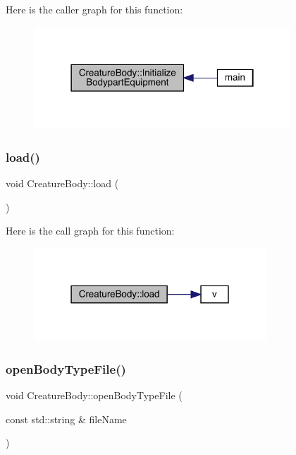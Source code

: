Here is the caller graph for this function\+:
\nopagebreak
\begin{figure}[H]
\begin{center}
\leavevmode
\includegraphics[width=273pt]{class_creature_body_af2b152c045862bb0fbc370b444bf98f0_icgraph}
\end{center}
\end{figure}
\mbox{\label{class_creature_body_a947efb646a893964de6244b886bab038}} 
\subsubsection{\texorpdfstring{load()}{load()}}
{\footnotesize\ttfamily void Creature\+Body\+::load (\begin{DoxyParamCaption}{ }\end{DoxyParamCaption})}

Here is the call graph for this function\+:
\nopagebreak
\begin{figure}[H]
\begin{center}
\leavevmode
\includegraphics[width=247pt]{class_creature_body_a947efb646a893964de6244b886bab038_cgraph}
\end{center}
\end{figure}
\mbox{\label{class_creature_body_ac4140e081c8970ad4330c253c615ba33}} 
\subsubsection{\texorpdfstring{open\+Body\+Type\+File()}{openBodyTypeFile()}}
{\footnotesize\ttfamily void Creature\+Body\+::open\+Body\+Type\+File (\begin{DoxyParamCaption}\item[{const std\+::string \&}]{file\+Name }\end{DoxyParamCaption})}

